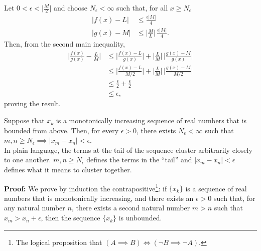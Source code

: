 Let $0< \epsilon < \Big| \frac{M}{2} \Big|$ and choose $N_\epsilon < \infty$ such that, for all $x \ge N_\epsilon$
\begin{align*}
    \big| f(x) -L \big| & \le \frac{\epsilon |M|}{4}  \\[1em]
   \big| g(x) -M \big| & \le  \Big|  \frac{M}{L} \Big| \, \frac{\epsilon |M| }{4} . 
\end{align*}
Then, from the second main inequality, 
\begin{align*}
    \Big|\frac{f(x)}{g(x)} - \frac{L}{M} \Big|& \le \Big|\frac{f(x) -L}{g(x)}  \Big| + \Big|  \frac{L}{M} \Big| \, \Big|\frac{g(x) - M }{g(x)}  \Big| \\[1em]
    & \le \Big|\frac{f(x) -L}{M/2}  \Big| + \Big|  \frac{L}{M} \Big| \, \Big|\frac{g(x) - M }{M/2}  \Big| \\[1em] 
    &\le \frac{\epsilon}{2} + \frac{\epsilon}{2} \\
    & \le \epsilon,
\end{align*}
proving the result.

\bigskip

\begin{tcolorbox}[title=\textcolor{black}{Analytical Background for Secrets of the Arcane~\ref{thm:ConstructRealNumber}: Why Euler's Number Exists}, sharp corners, colback=green!30, colframe=green!80!blue, breakable, fonttitle=\bfseries]

Suppose that $x_k$ is a monotonically increasing sequence of real numbers that is bounded from above. Then, for every $\epsilon>0$, there exists $N_\epsilon < \infty$ such that $m, n \ge N_\epsilon \implies |x_m-x_n| < \epsilon$. \\

In plain language, the terms at the tail of the sequence cluster arbitrarily closely to one another. $m, n \ge N_\epsilon$ defines the terms in the ``tail'' and $ |x_m-x_n| < \epsilon$ defines what it means to cluster together.
\end{tcolorbox}

\textbf{Proof:} We prove by induction the contrapositive\footnote{The logical proposition that $(A \implies B) \iff (\neg B \implies \neg A)$.}: if \( \{x_k\} \) is a sequence of real numbers that is monotonically increasing, and there exists an \( \epsilon > 0 \) such that, for any natural number \( n \), there exists a second natural number \( m > n \) such that \( x_m > x_n + \epsilon \), then the sequence \( \{x_k\} \) is unbounded.\\

